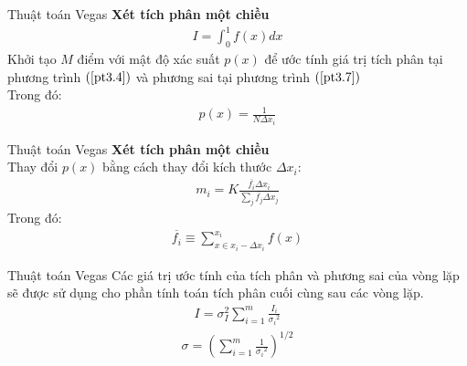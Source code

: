\documentclass{beamer}
\begin{document}
  \begin{frame}{Thuật toán Vegas}\vspace{4pt}
    \textbf{Xét tích phân một chiều}\\
    \vspace{0.4em}
    \begin{align}
      I=\int_0^1{f(x)dx}
\end{align}
Khởi tạo $M$ điểm với mật độ xác suất $p(x)$ để ước tính giá trị tích phân tại phương trình $(\ref{pt3.4}) $ và phương sai tại phương trình $(\ref{pt3.7})$\\
Trong đó:\\
\begin{align}
  p(x)=\frac{1}{N{\Delta}x_i}
\end{align}

\end{frame}

\begin{frame}{Thuật toán Vegas}\vspace{4pt}
  \textbf{Xét tích phân một chiều}\\
  \vspace{0.4em}
  Thay đổi $p(x)$ bằng cách thay đổi kích thước ${\Delta}x_i$: 
\begin{align}
  m_i=K{\frac{\overline{f_i}{\Delta}x_i}{\sum_j{\overline{f_j}{\Delta}x_j}}}\label{ptmi}
\end{align}
Trong đó: \\
\begin{align}
  \overline{f_i} \equiv {\sum_{x\in{x_i-\Delta}x_i}^{x_i}}{f(x)}\label{pt3.12}
\end{align}
\end{frame}

\begin{frame}{Thuật toán Vegas}\vspace{4pt}
  Các giá trị ước tính của tích phân và phương sai của vòng lặp sẽ được sử dụng cho phần tính toán tích phân cuối cùng sau các vòng lặp. 
  \begin{align}
        I=\sigma_I^2\sum_{i=1}^{m}{\frac{I_i}{{\sigma_i}^2}}
  \end{align}
  \begin{align}
        \sigma=\left(\sum_{i=1}^{m}{\frac{1}{{\sigma_i}^2}}\right)^{1/2}
  \end{align}
 \end{frame}

\end{document}
